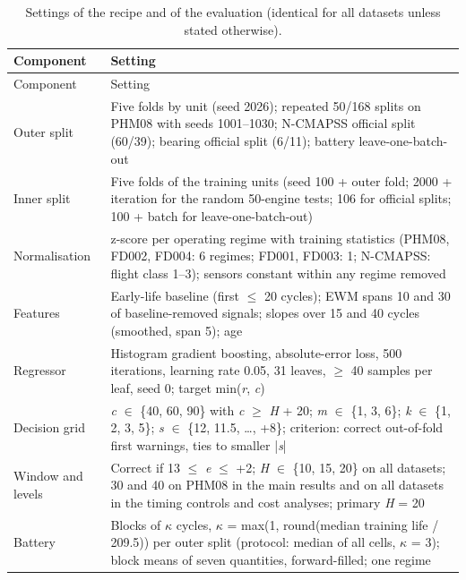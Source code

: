 \documentclass[11pt,a4paper]{article}
\begin{document}
{\footnotesize\setlength{\tabcolsep}{4pt}
\begin{longtable}{@{}>{\raggedright\arraybackslash}p{}>{\raggedright\arraybackslash}p{}@{}}
\caption{Settings of the recipe and of the evaluation (identical for all datasets unless stated otherwise).}\\
\toprule
Component & Setting \\
\midrule\endfirsthead
\toprule
Component & Setting \\
\midrule\endhead
\bottomrule\endfoot
Outer split & Five folds by unit (seed 2026); repeated 50/168 splits on PHM08 with seeds 1001--1030; N-CMAPSS official split (60/39); bearing official split (6/11); battery leave-one-batch-out \\
Inner split & Five folds of the training units (seed 100 + outer fold; 2000 + iteration for the random 50-engine tests; 106 for official splits; 100 + batch for leave-one-batch-out) \\
Normalisation & z-score per operating regime with training statistics (PHM08, FD002, FD004: 6 regimes; FD001, FD003: 1; N-CMAPSS: flight class 1--3); sensors constant within any regime removed \\
Features & Early-life baseline (first $\le$ 20 cycles); EWM spans 10 and 30 of baseline-removed signals; slopes over 15 and 40 cycles (smoothed, span 5); age \\
Regressor & Histogram gradient boosting, absolute-error loss, 500 iterations, learning rate 0.05, 31 leaves, $\ge$ 40 samples per leaf, seed 0; target min(\textit{r}, \textit{c}) \\
Decision grid & \textit{c} $\in$ \{40, 60, 90\} with \textit{c} $\ge$ \textit{H} + 20; \textit{m} $\in$ \{1, 3, 6\}; \textit{k} $\in$ \{1, 2, 3, 5\}; \textit{s} $\in$ \{\textminus{}12, \textminus{}11.5, \ldots{}, +8\}; criterion: correct out-of-fold first warnings, ties to smaller |\textit{s}| \\
Window and levels & Correct if \textminus{}13 $\le$ \textit{e} $\le$ +2; \textit{H} $\in$ \{10, 15, 20\} on all datasets; 30 and 40 on PHM08 in the main results and on all datasets in the timing controls and cost analyses; primary \textit{H} = 20 \\
Battery & Blocks of $\kappa$ cycles, $\kappa$ = max(1, round(median training life / 209.5)) per outer split (protocol: median of all cells, $\kappa$ = 3); block means of seven quantities, forward-filled; one regime \\

\end{longtable}}
\end{document}
